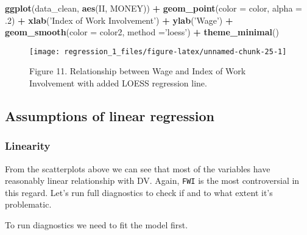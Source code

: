 \documentclass[]{article}
\newenvironment{Shaded}{\begin{snugshade}}{\end{snugshade}}
\newcommand{\DataTypeTok}[1]{\textcolor[rgb]{0.13,0.29,0.53}{#1}}
\newcommand{\FloatTok}[1]{\textcolor[rgb]{0.00,0.00,0.81}{#1}}
\newcommand{\KeywordTok}[1]{\textcolor[rgb]{0.13,0.29,0.53}{\textbf{#1}}}
\newcommand{\NormalTok}[1]{#1}
\newcommand{\OperatorTok}[1]{\textcolor[rgb]{0.81,0.36,0.00}{\textbf{#1}}}
\newcommand{\StringTok}[1]{\textcolor[rgb]{0.31,0.60,0.02}{#1}}
\begin{document}
\begin{Shaded}
\begin{Highlighting}[]
\KeywordTok{ggplot}\NormalTok{(data_clean, }\KeywordTok{aes}\NormalTok{(II, MONEY)) }\OperatorTok{+}\StringTok{ }\KeywordTok{geom_point}\NormalTok{(}\DataTypeTok{color =}\NormalTok{ color, }
                                          \DataTypeTok{alpha =} \FloatTok{.2}\NormalTok{) }\OperatorTok{+}\StringTok{ }
\StringTok{                               }\KeywordTok{xlab}\NormalTok{(}\StringTok{'Index of Work Involvement'}\NormalTok{) }\OperatorTok{+}\StringTok{ }
\StringTok{                               }\KeywordTok{ylab}\NormalTok{(}\StringTok{'Wage'}\NormalTok{) }\OperatorTok{+}\StringTok{ }
\StringTok{                               }\KeywordTok{geom_smooth}\NormalTok{(}\DataTypeTok{color  =}\NormalTok{ color2, }
                                           \DataTypeTok{method =}\StringTok{'loess'}\NormalTok{) }\OperatorTok{+}\StringTok{ }
\StringTok{                               }\KeywordTok{theme_minimal}\NormalTok{()}
\end{Highlighting}
\end{Shaded}

\begin{figure}

{\centering \texttt{[image: regression\_1\_files/figure-latex/unnamed-chunk-25-1]} 

}

\caption{Figure 11. Relationship between Wage and Index of Work Involvement with added LOESS regression line.}\label{fig:unnamed-chunk-25}
\end{figure}

\hypertarget{assumptions-of-linear-regression}{%
\subsection{Assumptions of linear
regression}\label{assumptions-of-linear-regression}}

\hypertarget{linearity}{%
\subsubsection{Linearity}\label{linearity}}

From the scatterplots above we can see that most of the variables have
reasonably linear relationship with DV. Again, \texttt{FWI} is the most
controversial in this regard. Let's run full diagnostics to check if and
to what extent it's problematic.

To run diagnostics we need to fit the model first.
\end{document}
